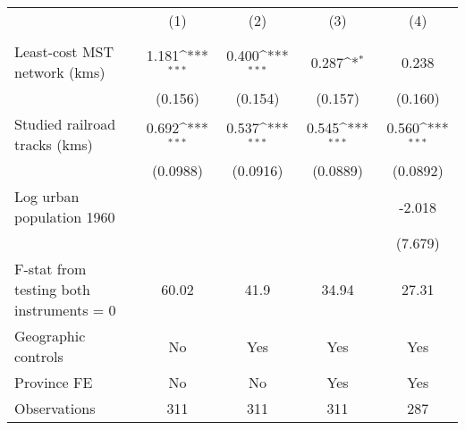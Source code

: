 {
\def\sym#1{\ifmmode^{#1}\else\(^{#1}\)\fi}
\begin{tabular}{l*{4}{c}}
\hline\hline
                &\multicolumn{1}{c}{(1)}&\multicolumn{1}{c}{(2)}&\multicolumn{1}{c}{(3)}&\multicolumn{1}{c}{(4)}\\
                &\multicolumn{1}{c}{}&\multicolumn{1}{c}{}&\multicolumn{1}{c}{}&\multicolumn{1}{c}{}\\
\hline
Least-cost MST network (kms)&    1.181\sym{***}&    0.400\sym{***}&    0.287\sym{*}  &    0.238         \\
                &  (0.156)         &  (0.154)         &  (0.157)         &  (0.160)         \\
[1em]
Studied railroad tracks (kms)&    0.692\sym{***}&    0.537\sym{***}&    0.545\sym{***}&    0.560\sym{***}\\
                & (0.0988)         & (0.0916)         & (0.0889)         & (0.0892)         \\
[1em]
Log urban population 1960&                  &                  &                  &   -2.018         \\
                &                  &                  &                  &  (7.679)         \\
\hline
F-stat from testing both instruments = 0&    60.02         &     41.9         &    34.94         &    27.31         \\
Geographic controls&       No         &      Yes         &      Yes         &      Yes         \\
Province FE     &       No         &       No         &      Yes         &      Yes         \\
Observations    &      311         &      311         &      311         &      287         \\
\hline\hline
\end{tabular}
}
